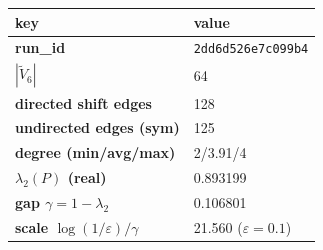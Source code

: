 \begin{tabular}{ll}%
\hline%
\textbf{key}&\textbf{value}\\%
\hline%
\textbf{run\_id}&\texttt{2dd6d526e7c099b4}\\%
\textbf{$|\widetilde V_6|$}&64\\%
\textbf{directed shift edges}&128\\%
\textbf{undirected edges (sym)}&125\\%
\textbf{degree (min/avg/max)}&2/3.91/4\\%
\textbf{$\lambda_2(P)$ (real)}&0.893199\\%
\textbf{gap $\gamma=1-\lambda_2$}&0.106801\\%
\textbf{scale $\log(1/\varepsilon)/\gamma$}&21.560 ($\varepsilon=0.1$)\\%
\hline%
\end{tabular}

